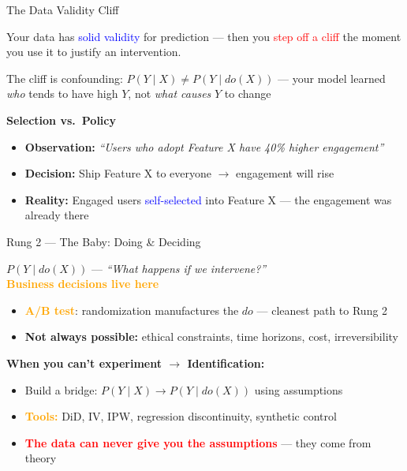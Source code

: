 \documentclass{beamer}
\newcommand{\blue}[1]{\textcolor{blue}{#1}}
\newcommand{\red}[1]{\textcolor{red}{#1}}
\newcommand{\orange}[1]{\textcolor{orange}{#1}}
\begin{document}
\begin{frame}{The Data Validity Cliff }

Your data has \blue{solid validity} for prediction --- then you \red{step off a cliff} the moment you use it to justify an intervention.

\vspace{0.08cm}
{\small The cliff is confounding: $P(Y \mid X) \neq P(Y \mid do(X))$ --- your model learned \emph{who} tends to have high $Y$, not \emph{what causes} $Y$ to change}

\vspace{0.12cm}
\textbf{Selection vs.\ Policy}
\begin{itemize}\setlength{\itemsep}{0.04cm}
    \item \textbf{Observation:} \textit{``Users who adopt Feature X have 40\% higher engagement''}
    \item \textbf{Decision:} Ship Feature X to everyone $\rightarrow$ engagement will rise
    \item \textbf{Reality:} Engaged users \blue{self-selected} into Feature X --- the engagement was already there
\end{itemize}

\end{frame}


\begin{frame}{Rung 2 --- The Baby: Doing \& Deciding }

$P(Y \mid do(X))$ --- \textit{``What happens if we intervene?''}  \\
\orange{\textbf{Business decisions live here}}

\vspace{0.15cm}
\begin{itemize}\setlength{\itemsep}{0.08cm}
    \item \orange{\textbf{A/B test}}: randomization manufactures the $do$ --- cleanest path to Rung 2
    \item \textbf{Not always possible:} ethical constraints, time horizons, cost, irreversibility
\end{itemize}

\vspace{0.15cm}
\textbf{When you can't experiment $\rightarrow$ Identification:}
\begin{itemize}\setlength{\itemsep}{0.05cm}
    \item Build a bridge: $P(Y \mid X) \rightarrow P(Y \mid do(X))$ using assumptions
    \item \orange{\textbf{Tools:}} DiD, IV, IPW, regression discontinuity, synthetic control
    \item \red{\textbf{The data can never give you the assumptions}} --- they come from theory
\end{itemize}

\end{frame}
\end{document}
